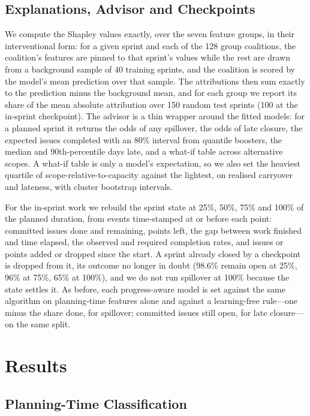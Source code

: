 \documentclass[conference]{IEEEtran}
\begin{document}
\subsection{Explanations, Advisor and Checkpoints}

We compute the Shapley values exactly, over the seven feature groups, in their interventional form: for a given sprint and each of the 128 group coalitions, the coalition's features are pinned to that sprint's values while the rest are drawn from a background sample of 40 training sprints, and the coalition is scored by the model's mean prediction over that sample. The attributions then sum exactly to the prediction minus the background mean, and for each group we report its share of the mean absolute attribution over 150 random test sprints (100 at the in-sprint checkpoint). The advisor is a thin wrapper around the fitted models: for a planned sprint it returns the odds of any spillover, the odds of late closure, the expected issues completed with an 80\% interval from quantile boosters, the median and 90th-percentile days late, and a what-if table across alternative scopes. A what-if table is only a model's expectation, so we also set the heaviest quartile of scope-relative-to-capacity against the lightest, on realised carryover and lateness, with cluster bootstrap intervals.

For the in-sprint work we rebuild the sprint state at 25\%, 50\%, 75\% and 100\% of the planned duration, from events time-stamped at or before each point: committed issues done and remaining, points left, the gap between work finished and time elapsed, the observed and required completion rates, and issues or points added or dropped since the start. A sprint already closed by a checkpoint is dropped from it, its outcome no longer in doubt (98.6\% remain open at 25\%, 96\% at 75\%, 65\% at 100\%), and we do not run spillover at 100\% because the state settles it. As before, each progress-aware model is set against the same algorithm on planning-time features alone and against a learning-free rule---one minus the share done, for spillover; committed issues still open, for late closure---on the same split.

\section{Results}

\subsection{Planning-Time Classification}
\end{document}
